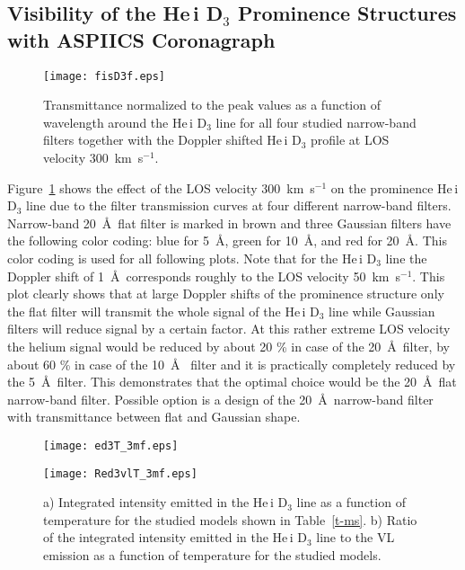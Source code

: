 \documentclass[namedreferences]{solarphysics}
\begin{document}
\begin{article}
\section{Visibility of the He\,{\sc i} D$_3$ Prominence Structures with ASPIICS Coronagraph}
	\label{s-vis}


\begin{figure}    %
\centerline{\texttt{[image: fisD3f.eps]}
            }
\caption{Transmittance normalized to the peak values as a function of wavelength around the He\,{\sc i} D$_{3}$ 
line for all four studied narrow-band filters together with the Doppler shifted He\,{\sc i} D$_{3}$ profile at LOS velocity 300~km~s$^{-1}$.}
\label{f-fs}
\end{figure}

Figure~\ref{f-fs} shows the effect of the LOS velocity 300~km~s$^{-1}$ on the prominence He\,{\sc i} D$_{3}$ line due to the filter 
transmission curves at four different narrow-band filters. 
Narrow-band 20~\AA~flat filter is marked in brown and three Gaussian filters have the following color coding: blue for 5~\AA, green for 10~\AA, 
and red for 20~\AA. This color coding is used for all following plots. Note that for the He\,{\sc i} D$_{3}$ line the Doppler shift of 
1~\AA~corresponds roughly to the LOS velocity 50~km~s$^{-1}$. This plot clearly shows that at large Doppler shifts of the prominence structure only 
the flat filter will transmit the whole signal of the He\,{\sc i} D$_{3}$ line while Gaussian filters will reduce signal by a certain factor. 
At this rather extreme LOS velocity the helium signal would be reduced by about 20 \% in case of the 20~\AA~filter, by about 60  \% in case of the 10~\AA~ filter and it is practically completely reduced by the 5~\AA~filter. 
This demonstrates that the optimal choice would be the 20~\AA~flat narrow-band filter. Possible option is a design of the 20~\AA~narrow-band filter with 
transmittance between flat and Gaussian shape.  
 
\begin{figure}    %
\centerline{\hspace*{0.015\textwidth}
            \texttt{[image: ed3T\_3mf.eps]}
            \hspace*{-0.02\textwidth}
            }
\vspace{0.01\textwidth}
\centerline{\hspace*{0.015\textwidth}
            \texttt{[image: Red3vlT\_3mf.eps]}
            \hspace*{-0.03\textwidth}
            }
\caption{a) Integrated intensity emitted in the He\,{\sc i} D$_{3}$ line  as a function of temperature for the studied models shown in 
Table~\ref{t-ms}. 
b) Ratio of the integrated intensity emitted in the He\,{\sc i} D$_{3}$ line to the VL emission as a function of temperature for the 
studied models.}
\label{f-ms}  
\end{figure}


\end{article}
\end{document}
